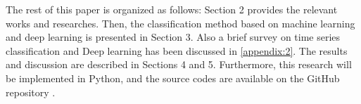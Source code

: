  

The rest of this paper is organized as follows: Section 2 provides the relevant works and researches. Then,%
 the classification method based on machine learning and deep learning is presented in Section 3. Also a brief survey on time series classification and Deep learning has been discussed in \ref{appendix:2}. The results and discussion are described in Sections 4 and 5.
Furthermore, this research will be implemented in Python, and the source codes are available on the GitHub repository \cite{SKazemii/EE6563}. 









